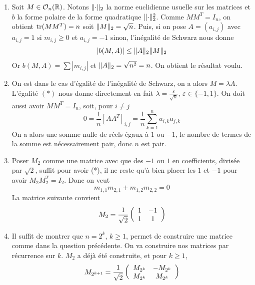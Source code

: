 \begin{solution}
	\begin{enumerate}
		\item Soit $M\in\mathcal O_n(\operatorname{\mathbb R})$. 
		Notons $\lVert\cdot\rVert_2$ la norme euclidienne usuelle sur les matrices et $b$ la forme polaire de la forme quadratique $\lVert\cdot\rVert_2^2$. 
		Comme $MM^T=I_n$, on obtient $\operatorname{tr}(MM^T)=n$ soit $\lVert M\rVert_2=\sqrt n$. 
		Puis, si on pose $A=(a_{i,j})$ avec $a_{i,j}=1$ si $m_{i,j}\geq 0$ et $a_{i,j}=-1$ sinon, l'inégalité de Schwarz nous donne
		\[
			|b(M,A)|\leq\lVert A\rVert_2\lVert M\rVert_2
		\]
		Or $b(M,A)=\sum|m_{i,j}|$ et $\lVert A\rVert_2=\sqrt{n^2}=n$. 
		On obtient le résultat voulu.

		\item On est dans le cas d'égalité de l'inégalité de Schwarz, on a alors $M=\lambda A$.
		L'égalité $(*)$ nous donne directement en fait $\lambda=\frac\varepsilon{\sqrt n}$, $\varepsilon\in\lbrace -1,1\rbrace$. 
		On doit aussi avoir $MM^T=I_n$, soit, pour $i\neq j$
		\[
			0=\frac1n[AA^T]_{i,j}=\frac1n\sum_{k=1}^na_{i,k}a_{j,k}
		\]
		On a alors une somme nulle de réels égaux à $1$ ou $-1$, le nombre de termes de la somme est nécessairement pair, donc $n$ est pair.

		\item Poser $M_2$ comme une matrice avec que des $-1$ ou $1$ en coefficients, divisée par $\sqrt2$, suffit pour avoir (*),
		il ne reste qu'à bien placer les $1$ et $-1$ pour avoir $M_2M_2^T=I_2$. 
		Donc on veut
		\[
			m_{1,1}m_{2,1}+m_{1,2}m_{2,2}=0
		\]
		La matrice suivante convient 
		\[
			M_2=\frac1{\sqrt2}\left(\begin{array}{c c} 1 & -1\\ 1 & 1\end{array}\right)
		\]
		
		\item Il suffit de montrer que $n=2^k$, $k\geq 1$, permet de construire une matrice comme dans la question précédente.
		On va construire nos matrices par récurrence sur $k$. 
		$M_2$ a déjà été construite, et pour $k\geq 1$, 
		\[
			M_{2^{k+1}}=\frac1{\sqrt2}\left(\begin{array}{c c} M_{2^k} & -M_{2^k}\\ M_{2^k} & M_{2^k}\end{array}\right)
		\]
		

\end{enumerate}
\end{solution}
